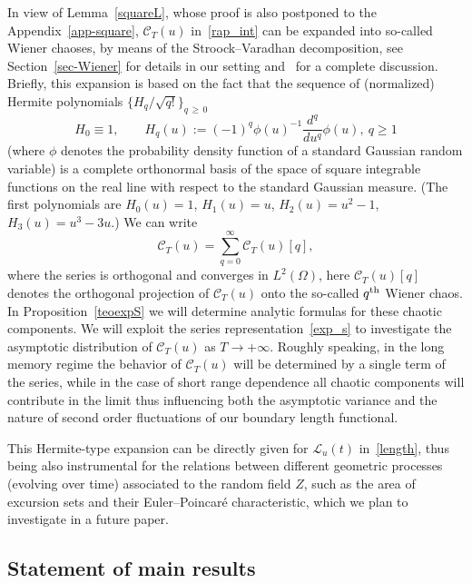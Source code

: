\documentclass[AHL,Unicode,longabstracts,published]{cedram}
\newcommand{\clC}{\mathcal{C}}
\newcommand{\clL}{\mathcal{L}}
\begin{document}
In view of Lemma~\ref{squareL}, whose proof is also postponed to the Appendix~\ref{app-square}, $\clC_T (u)$ in~\eqref{rap_int} can be expanded into so-called Wiener chaoses, by means of the Stroock--Varadhan decomposition, see Section~\ref{sec-Wiener} for details in our setting and~\cite[\S~2.2] {noupebook} for a complete discussion. Briefly, this expansion is based on the fact that the sequence of (normalized) Hermite polynomials
$\{ H_q/\sqrt{q!}\}_{q\,\ge\,0}$
\begin{equation}\label{Herm}
H_0\equiv 1,\qquad H_{q}(u):=(-1)^{q}\phi (u)^{-1}\frac{d^q}{du^q}\phi(u), \ q\ge 1
\end{equation}
(where $\phi$ denotes the probability density function of a standard Gaussian random variable) is a complete orthonormal basis of the space of square integrable functions on the real line with respect to the standard Gaussian measure. (The first polynomials are $H_0(u)=1$, $H_1(u)=u$, $ H_2(u)=u^2-1$, $H_3(u) = u^3 - 3u$.) We can write
\begin{equation}\label{exp_s}
\clC_{T}(u)=\sum_{q=0}^{\infty }\clC_{T}(u)[q],
\end{equation}
where the series is orthogonal and converges in $L^2(\Omega)$, here $\clC_{T}(u)[q]$ denotes the orthogonal projection of $\clC _T(u) $ onto the so-called $q^{\rm th}$ Wiener chaos. In Proposition~\ref{teoexpS} we will determine analytic formulas for these chaotic components. We will exploit the series representation~\eqref{exp_s} to investigate the asymptotic distribution of $\clC_T(u)$ as $T\to +\infty$. Roughly speaking, in the long memory regime the behavior of $\clC_T(u)$ will be determined by a single term of the series, while in the case of short range dependence all chaotic components will contribute in the limit thus influencing both the asymptotic variance and the nature of second order fluctuations of our boundary length functional.

\begin{rema}
This Hermite-type expansion can be directly given for $\clL _u(t)$ in~\eqref{length}, thus being also instrumental for the relations between different geometric processes (evolving over time) associated to the random field $Z$, such as the area of excursion sets and their Euler--Poincaré characteristic, which we plan to investigate in a future paper.
\end{rema}

\subsection{Statement of main results}
\end{document}
